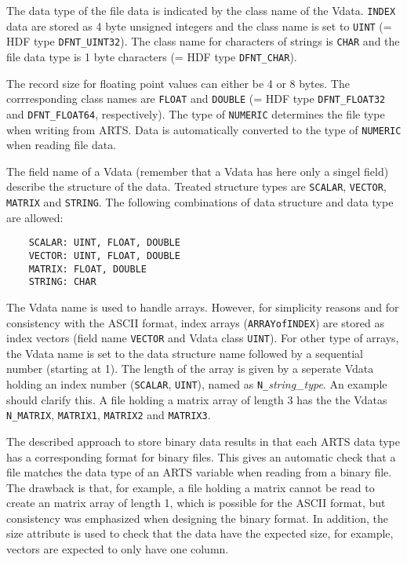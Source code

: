  The data type of the file data is indicated by the class name of the
 Vdata. \verb|INDEX| data are stored as 4 byte unsigned integers and
 the class name is set to \verb|UINT| (= HDF type \verb|DFNT_UINT32|).
 The class name for characters of strings is \verb|CHAR| and the file
 data type is 1 byte characters (= HDF type \verb|DFNT_CHAR|).

 The record size for floating point values can either be 4 or 8 bytes.
 The corrresponding class names are \verb|FLOAT| and \verb|DOUBLE|
 (= HDF type \verb|DFNT_FLOAT32| and \verb|DFNT_FLOAT64|, respectively).
 The type of \verb|NUMERIC| determines the file type when writing from
 ARTS. Data is automatically converted to the type of \verb|NUMERIC|
 when reading file data.
 
 The field name of a Vdata (remember that a Vdata has here only a
 singel field) describe the structure of the data. Treated structure
 types are \verb|SCALAR|, \verb|VECTOR|, \verb|MATRIX| and \verb|STRING|.
 The following combinations of data structure and data type are allowed:
 \begin{verbatim}
    SCALAR: UINT, FLOAT, DOUBLE 
    VECTOR: UINT, FLOAT, DOUBLE 
    MATRIX: FLOAT, DOUBLE 
    STRING: CHAR
 \end{verbatim} 
 The Vdata name is used to handle arrays. However, for simplicity
 reasons and for consistency with the ASCII format, index arrays
 (\verb|ARRAYofINDEX|) are stored as index vectors (field name
 \verb|VECTOR| and Vdata class \verb|UINT|). For other type of
 arrays, the Vdata name is set to the data structure name followed
 by a sequential number (starting at 1). The length of the array
 is given by a seperate Vdata holding an index number (\verb|SCALAR|,
 \verb|UINT|), named as \verb|N_|{\it string\_type}. An example should
 clarify this. A file holding a matrix array of length 3 has the
 the Vdatas \verb|N_MATRIX|, \verb|MATRIX1|, \verb|MATRIX2| and
 \verb|MATRIX3|.

 The described approach to store binary data results in that each
 ARTS data type has a corresponding format for binary files. This 
 gives an automatic check that a file matches the data type of
 an ARTS variable when reading from a binary file. The drawback
 is that, for example, a file holding a matrix cannot be read to create
 an matrix array of length 1, which is possible for the ASCII format,
 but consistency was emphasized when designing the binary format.
 In addition, the size attribute is used to check that the data
 have the expected size, for example, vectors are expected to only
 have one column.
 

